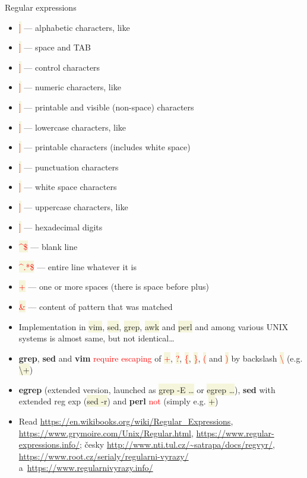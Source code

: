 \documentclass[compress, ucs, xelatex, 11pt, xcolor=svgnames, aspectratio=169,
	hyperref={
		bookmarks=true,
		unicode=true,
		colorlinks=true,
		pdftitle={Linux, command line and MetaCentrum},
		plainpages=false,
		pdfauthor={Vojtech Zeisek},
		pdfsubject={Course about use of Linux command line, writing shell scripts and using MetaCentrum of CESNET},
		pdfcreator={XeLaTeX},
		pdfkeywords={Linux, GNU, BASH, shell, command line, MetaCentrum},
		linkcolor=DarkRed, %
		anchorcolor=DarkBlue, %
		citecolor=Indigo, %
		filecolor=NavyBlue, %
		menucolor=DarkMagenta, %
		urlcolor=DarkBlue, %
		pdftex},
	url={hyphens, lowtilde} %
	]{beamer}
\renewcommand{\texttt}[1]{\colorbox{Beige}{{\ttfamily #1}}}
\renewcommand{\alert}[1]{\textcolor{red}{#1}}
\begin{document}
\begin{frame}[allowframebreaks]{Regular expressions}
\begin{itemize}
		\item \alert{\texttt{[[:alpha:]]}} --- alphabetic characters, like \texttt{[a-zA-Z]}
		\item \alert{\texttt{[[:blank:]]}} --- space and TAB
		\item \alert{\texttt{[[:cntrl:]]}} --- control characters
		\item \alert{\texttt{[[:digit:]]}} --- numeric characters, like \texttt{[0-9]}
		\item \alert{\texttt{[[:graph:]]}} --- printable and visible (non-space) characters
		\item \alert{\texttt{[[:lower:]]}} --- lowercase characters, like \texttt{[a-z]}
		\item \alert{\texttt{[[:print:]]}} --- printable characters (includes white space)
		\item \alert{\texttt{[[:punct:]]}} --- punctuation characters
		\item \alert{\texttt{[[:space:]]}} --- white space characters
		\item \alert{\texttt{[[:upper:]]}} --- uppercase characters, like \texttt{[A-Z]}
		\item \alert{\texttt{[[:xdigit:]]}} --- hexadecimal digits
		\item \alert{\texttt{\textasciicircum\$}} --- blank line
		\item \alert{\texttt{\textasciicircum.*\$}} --- entire line whatever it is
		\item \alert{\texttt{ +}} --- one or more spaces (there is space before plus)
		\item \alert{\texttt{\&}} --- content of pattern that was matched
		\item Implementation in \texttt{vim}, \texttt{sed}, \texttt{grep}, \texttt{awk} and \texttt{perl} and among various UNIX systems is almost same, but not identical\ldots
		\item \textbf{grep}, \textbf{sed} and \textbf{vim} \alert{require escaping} of \alert{\texttt{+}}, \alert{\texttt{?}}, \alert{\texttt{\{}}, \alert{\texttt{\}}}, \alert{\texttt{(}} and \alert{\texttt{)}} by backslash \alert{\texttt{\textbackslash}} (e.g. \texttt{\textbackslash +})
		\item \textbf{egrep} (extended version, launched as \texttt{grep -E \ldots} or \texttt{egrep \ldots}), \textbf{sed} with extended reg exp (\texttt{sed -r}) and \textbf{perl} \alert{not} (simply e.g. \texttt{+})
		\item Read \url{https://en.wikibooks.org/wiki/Regular_Expressions}, \url{https://www.grymoire.com/Unix/Regular.html}, \url{https://www.regular-expressions.info/}; česky \url{http://www.nti.tul.cz/~satrapa/docs/regvyr/}, \url{https://www.root.cz/serialy/regularni-vyrazy/} a~\url{https://www.regularnivyrazy.info/}

\end{itemize}
\end{frame}
\end{document}
